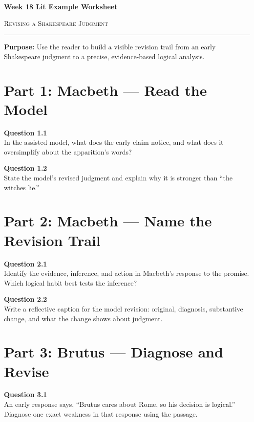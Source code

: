 \documentclass[12pt]{article}
\begin{document}
\begin{center}
{\LARGE\bfseries Week 18 Lit Example Worksheet}\par\vspace{0.05em}
{\large\scshape Revising a Shakespeare Judgment}\par\vspace{0.12em}
\rule{0.78\textwidth}{0.5pt}
\end{center}
\textbf{Purpose:} Use the reader to build a visible revision trail from an early Shakespeare judgment to a precise, evidence-based logical analysis.

\section*{Part 1: Macbeth --- Read the Model}
\textbf{Question 1.1}\\[-0.15em]
In the assisted model, what does the early claim notice, and what does it oversimplify about the apparition's words?

\textbf{Question 1.2}\\[-0.15em]
State the model's revised judgment and explain why it is stronger than ``the witches lie.''

\newpage
\section*{Part 2: Macbeth --- Name the Revision Trail}
\textbf{Question 2.1}\\[-0.15em]
Identify the evidence, inference, and action in Macbeth's response to the promise. Which logical habit best tests the inference?

\textbf{Question 2.2}\\[-0.15em]
Write a reflective caption for the model revision: original, diagnosis, substantive change, and what the change shows about judgment.

\newpage
\section*{Part 3: Brutus --- Diagnose and Revise}
\textbf{Question 3.1}\\[-0.15em]
An early response says, ``Brutus cares about Rome, so his decision is logical.'' Diagnose one exact weakness in that response using the passage.
\end{document}

